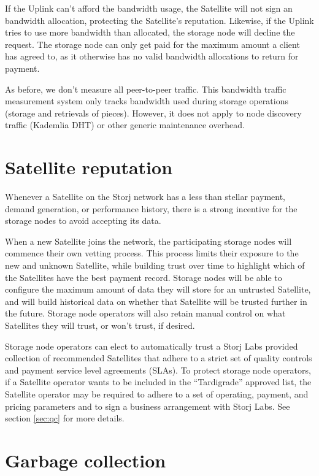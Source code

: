 \documentclass[8pt,fleqn,openany]{book}
\begin{document}
If the Uplink can't afford the bandwidth usage, the Satellite will not sign an
bandwidth allocation, protecting the Satellite's reputation.
Likewise, if the Uplink tries to use more bandwidth than allocated,
the storage node will decline the request.
The storage node can only get paid for the maximum amount a client has agreed to,
as it otherwise has no valid bandwidth allocations to return for payment.

As before, we don't measure all peer-to-peer traffic.
This bandwidth traffic measurement system only tracks
bandwidth used during storage operations (storage and retrievals of pieces).
However, it  does not apply to node discovery traffic (Kademlia DHT) or other generic
maintenance overhead.

\section{Satellite reputation}\label{sec:concrete-satellite-reputation}

Whenever a Satellite on the Storj network has a less than stellar payment,
demand generation, or performance history,
there is a strong incentive for the storage nodes to avoid accepting its data.

When a new Satellite joins the network, the participating storage nodes will
commence their own vetting process.
This process limits their exposure to the new and unknown
Satellite, while building trust over time to highlight which of the
Satellites have the best payment record.
Storage nodes will be able to configure the maximum amount of data they will
store for an untrusted Satellite, and will build historical data on whether
that Satellite will be trusted further in the future.
Storage node operators will also retain manual control on what Satellites they
will trust, or won't trust, if desired.

Storage node operators can elect to automatically trust a Storj Labs
provided collection of recommended Satellites that adhere to a strict set of
quality controls and payment service level agreements (SLAs).
To protect storage node operators, if a Satellite operator wants to be
included in the ``Tardigrade'' approved list,
the Satellite operator may be required to
adhere to a set of operating, payment, and pricing parameters and to sign a
business arrangement with Storj Labs.
See section \ref{sec:qc} for more details.

\section{Garbage collection}\label{sec:garbage-collection}
\end{document}
